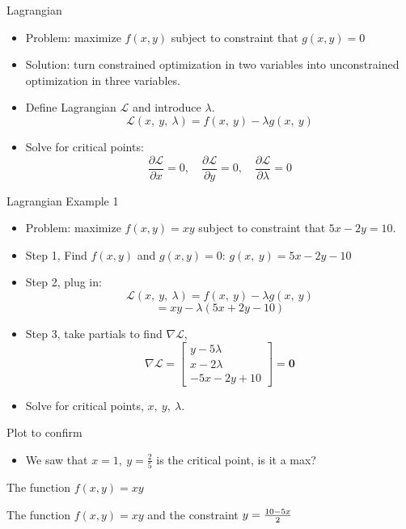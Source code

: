 \documentclass{beamer}
\numberwithin{equation}{section}
\begin{document}
\begin{frame}{Lagrangian}
\begin{itemize}
\item Problem: maximize $f(x,y)$ subject to constraint that $g(x,y)=0$
\item Solution: turn constrained optimization in two variables into unconstrained optimization in three variables.\pause
\item Define Lagrangian $\mathcal{L}$ and introduce $\lambda$.\pause
$$\mathcal{L}(x,\ y,\ \lambda)=f(x,\ y) - \lambda g(x,\ y)$$\pause
\item Solve for critical points:\pause
$$\frac{\partial \mathcal{L}}{\partial x}=0, \quad \frac{\partial \mathcal{L}}{\partial y}=0,\quad \frac{\partial \mathcal{L}}{\partial \lambda}=0$$
\end{itemize}
\end{frame}


\begin{frame}{Lagrangian Example 1}
\begin{itemize}
\item Problem: maximize $f(x,y)=xy$ subject to constraint that $5x-2y=10$.\pause
\item Step 1, Find $f(x, y)$ and $g(x, y)=0$:  $g(x,\ y)=5x-2y-10$\pause
\item Step 2, plug in:
$$\mathcal{L}(x,\ y,\ \lambda)=f(x,\ y) - \lambda g(x,\ y)$$\pause
$$=xy - \lambda(5x+2y-10) $$\pause
\item Step 3, take partials to find $\nabla \mathcal{L}$,
$$\nabla \mathcal{L}=\begin{bmatrix}y-5\lambda\\ x-2\lambda\\ -5x-2y+10 \end{bmatrix}=\mathbf{0}$$
\item Solve for critical points, $x,\ y,\ \lambda$. 
\end{itemize}
\end{frame}


\begin{frame}{Plot to confirm}
\begin{itemize}
\item We saw that $x=1,\ y=\frac{2}{5}$ is the critical point, is it a max?
\end{itemize}
\begin{center}
The function $f(x, y)=xy$


The function $f(x, y)=xy$ and the constraint $y={{10-5x}\over{2}}$

\end{center}

\end{frame}
\end{document}
